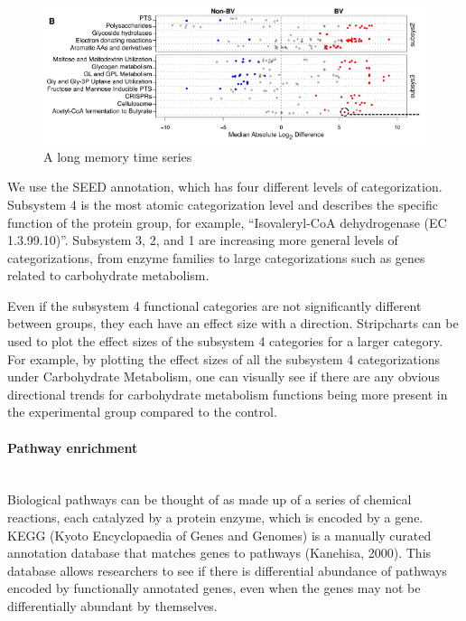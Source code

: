 \begin{figure}[h]
\begin{center}
\includegraphics[width=\textwidth]{stripchart.png}
\caption{A long memory time series\label{ts1}}
\end{center}
\end{figure}

We use the SEED annotation, which has four different levels of categorization. Subsystem 4 is the most atomic categorization level and describes the specific function of the protein group, for example, “Isovaleryl-CoA dehydrogenase (EC 1.3.99.10)”. Subsystem 3, 2, and 1 are increasing more general levels of categorizations, from enzyme families to large categorizations such as genes related to carbohydrate metabolism.

Even if the subsystem 4 functional categories are not significantly different between groups, they each have an effect size with a direction. Stripcharts can be used to plot the effect sizes of the subsystem 4 categories for a larger category. For example, by plotting the effect sizes of all the subsystem 4 categorizations under Carbohydrate Metabolism, one can visually see if there are any obvious directional trends for carbohydrate metabolism functions being more present in the experimental group compared to the control.

\FloatBarrier

\paragraph{Pathway enrichment}\mbox{}\\
Biological pathways can be thought of as made up of a series of chemical reactions, each catalyzed by a protein enzyme, which is encoded by a gene. KEGG (Kyoto Encyclopaedia of Genes and Genomes) is a manually curated annotation database that matches genes to pathways (Kanehisa, 2000). This database allows researchers to see if there is differential abundance of pathways encoded by functionally annotated genes, even when the genes may not be differentially abundant by themselves.

